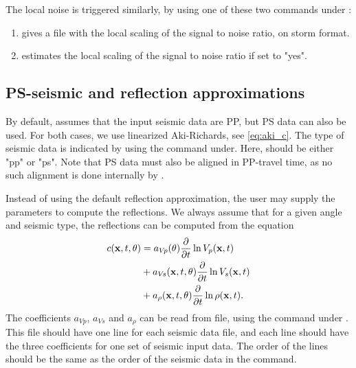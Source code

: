The local noise is triggered similarly, by using one of these two
commands under : 
\begin{enumerate}
\item {} gives a file with the local scaling of
  the signal to noise ratio, on storm format. 
\item {} estimates the local scaling of the
  signal to noise ratio if set to "yes". 
\end{enumerate}

\subsection{PS-seismic and reflection approximations}
By default, \crava assumes that the input seismic data are PP, but PS
data can also be used. For both cases, we use  linearized
Aki-Richards, see \autoref{eq:aki_c}. The type of seismic data is
indicated by using the  command
under. Here,  should be either "pp" or
"ps". Note that PS data must also be aligned in PP-travel time, as no
such alignment is done internally by \crava. 

Instead of using the default reflection approximation, the user may
supply the parameters to compute the reflections. We always assume
that for a given angle and seismic type, the reflections can be
computed from the equation 
\begin{equation}
\begin{split}
  c(\mathbf{x},t,\theta)
  & = a_{V\!p} (\theta) \frac{\partial}{\partial t}\ln V_p (\mathbf{x},t)\\
  & + a_{V\!s} (\mathbf{x},t,\theta) \frac{\partial}{\partial t}\ln V_s (\mathbf{x},t)\\
  & + a_\rho(\mathbf{x},t,\theta) \frac{\partial}{\partial t}\ln\rho(\mathbf{x},t).
\label{eq:linrefl}
\end{split}
\end{equation}
The coefficients $a_{V\!p}$, $a_{V\!s}$ and $a_\rho$ can be read from
file, using the 
command under . This file should have one line
for each seismic data file, and each line should have the three
coefficients for one set of seismic input data. The order of the lines
should be the same as the order of the seismic data in the 
command. 

